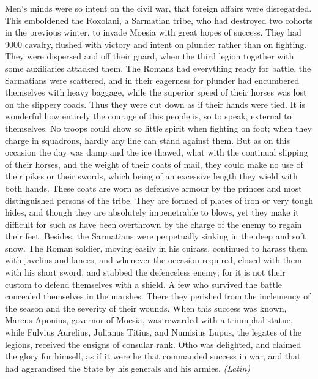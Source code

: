 
Men's minds were so intent on the civil war, that foreign affairs were disregarded. This emboldened the Roxolani, a Sarmatian tribe, who had destroyed two cohorts in the previous winter, to invade Moesia with great hopes of success. They had 9000 cavalry, flushed with victory and intent on plunder rather than on fighting. They were dispersed and off their guard, when the third legion together with some auxiliaries attacked them. The Romans had everything ready for battle, the Sarmatians were scattered, and in their eagerness for plunder had encumbered themselves with heavy baggage, while the superior speed of their horses was lost on the slippery roads. Thus they were cut down as if their hands were tied. It is wonderful how entirely the courage of this people is, so to speak, external to themselves. No troops could show so little spirit when fighting on foot; when they charge in squadrons, hardly any line can stand against them. But as on this occasion the day was damp and the ice thawed, what with the continual slipping of their horses, and the weight of their coats of mail, they could make no use of their pikes or their swords, which being of an excessive length they wield with both hands. These coats are worn as defensive armour by the princes and most distinguished persons of the tribe. They are formed of plates of iron or very tough hides, and though they are absolutely impenetrable to blows, yet they make it difficult for such as have been overthrown by the charge of the enemy to regain their feet. Besides, the Sarmatians were perpetually sinking in the deep and soft snow. The Roman soldier, moving easily in his cuirass, continued to harass them with javelins and lances, and whenever the occasion required, closed with them with his short sword, and stabbed the defenceless enemy; for it is not their custom to defend themselves with a shield. A few who survived the battle concealed themselves in the marshes. There they perished from the inclemency of the season and the severity of their wounds. When this success was known, Marcus Aponius, governor of Moesia, was rewarded with a triumphal statue, while Fulvius Aurelius, Julianus Titius, and Numisius Lupus, the legates of the legions, received the ensigns of consular rank. Otho was delighted, and claimed the glory for himself, as if it were he that commanded success in war, and that had aggrandised the State by his generals and his armies. \emph{(Latin)}


